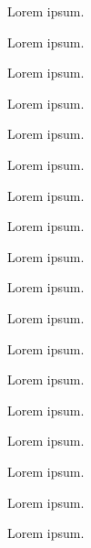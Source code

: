 
Lorem ipsum.


Lorem ipsum.


Lorem ipsum.


Lorem ipsum.


Lorem ipsum.


Lorem ipsum.


Lorem ipsum.


Lorem ipsum.


Lorem ipsum.


Lorem ipsum.


Lorem ipsum.


Lorem ipsum.


Lorem ipsum.


Lorem ipsum.


Lorem ipsum.


Lorem ipsum.


Lorem ipsum.


Lorem ipsum.
